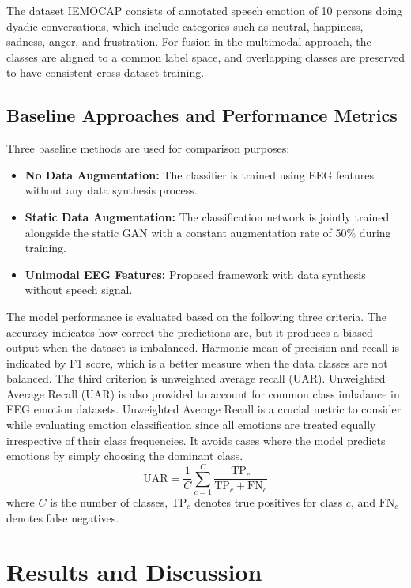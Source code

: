 \documentclass[conference]{IEEEtran}
\begin{document}
The dataset IEMOCAP consists of annotated speech emotion of 10 persons doing dyadic conversations, which include categories such as neutral, happiness, sadness, anger, and frustration. For fusion in the multimodal approach, the classes are aligned to a common label space, and overlapping classes are preserved to have consistent cross-dataset training.
\subsection{Baseline Approaches and Performance Metrics}

Three baseline methods are used for comparison purposes:
\begin{itemize}
\item \textbf{No Data Augmentation:} The classifier is trained using EEG features without any data synthesis process.
\item \textbf{Static Data Augmentation:} The classification network is jointly trained alongside the static GAN with a constant augmentation rate of 50\% during training.
\item \textbf{Unimodal EEG Features:} Proposed framework with data synthesis without speech signal.
\end{itemize}

The model performance is evaluated based on the following three criteria. The accuracy indicates how correct the predictions are, but it produces a biased output when the dataset is imbalanced. Harmonic mean of precision and recall is indicated by F1 score, which is a better measure when the data classes are not balanced. The third criterion is unweighted average recall (UAR). Unweighted Average Recall (UAR) is also provided to account for common class imbalance in EEG emotion datasets. Unweighted Average Recall is a crucial metric to consider while evaluating emotion classification since all emotions are treated equally irrespective of their class frequencies. It avoids cases where the model predicts emotions by simply choosing the dominant class.
\begin{equation}
\label{eq:uar}
\text{UAR} = \frac{1}{C} \sum_{c=1}^{C} \frac{\text{TP}_c}{\text{TP}_c + \text{FN}_c}
\end{equation}
where $C$ is the number of classes, $\text{TP}_c$ denotes true positives for class $c$, and $\text{FN}_c$ denotes false negatives.

\section{Results and Discussion}
\end{document}
